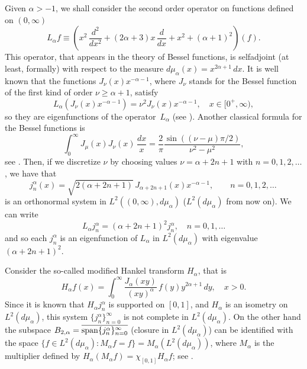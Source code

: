 \documentclass[11pt,a4paper]{amsart}
\newcommand{\htr}{H_{\alpha}} %
\newcommand{\ma}{M_{\alpha}}
\newcommand{\mua}{d\mu_\alpha}
\newcommand{\jna}{j_n^{\alpha}}
\newcommand{\spa}{\operatornamewithlimits{span}} %
\theoremstyle{plain}
\theoremstyle{remark}
\begin{document}
Given $\alpha > -1$, we shall consider the second order operator on functions defined on $(0,\infty)$
\[
  L_\alpha f \equiv \left(x^2\, \frac{d^2}{dx^2}
    + (2\alpha+3)x\, \frac{d}{dx} + x^2 + (\alpha+1)^2 \right)(f).
\]
This operator, that appears in the theory of Bessel functions,
is selfadjoint (at least, formally) with respect to the measure
$\mua(x) = x^{2\alpha+1}\,dx$. It is well known that the functions
$J_{\nu}(x) x^{-\alpha-1}$, where $J_\nu$ stands for the Bessel function
of the first kind of order $\nu \ge \alpha+1$, satisfy
\[
  L_\alpha (J_{\nu}(x) x^{-\alpha-1}) = \nu^2 J_{\nu}(x) x^{-\alpha-1},
  \quad x \in [0^+,\infty),
\]
so they are eigenfunctions of the operator~$L_\alpha$
(see \cite[\S\,5.73, p.~158]{Wat}).
Another classical formula for the Bessel functions is
\[
  \int_0^\infty J_{\mu}(x) J_{\nu}(x)\,\frac{dx}{x}
  = \frac{2}{\pi} \frac{\sin((\nu-\mu)\pi/2)}{\nu^2-\mu^2},
\]
see \cite[\S\,13.41, p.~404]{Wat}.
Then, if we discretize $\nu$ by choosing values $\nu = \alpha+2n+1$
with $n = 0,1,2,\dots$, we have that
\begin{equation*}
  \jna(x) = \sqrt{2(\alpha+2n+1)}\,J_{\alpha+2n+1}(x) x^{-\alpha-1},
  \qquad n = 0,1,2,\dots\,
\end{equation*}
is an orthonormal system in $L^2((0,\infty),\mua)$ ($L^2(\mua)$ from now on).
We can write
\[
  L_\alpha \jna = (\alpha+2n+1)^2 \jna, \quad n=0,1,\dots
\]
and so each $\jna$ is an eigenfunction of $L_\alpha$ in $L^2(\mua)$ with eigenvalue $(\alpha+2n+1)^2$.

Consider the so-called modified Hankel transform $H_\alpha$, that is 
\begin{equation}
\label{eq:htr}
  \htr f(x) = \int_0^\infty \frac{J_\alpha(xy)}{(xy)^\alpha} \, f(y)
    y^{2\alpha+1} \, dy,
  \quad x>0.
\end{equation}
Since it is known that $\htr \jna$ is supported on $[0,1]$, and $\htr$ is an isometry on $L^2(\mua)$, this system $\{\jna\}_{n=0}^\infty$ is not complete in $L^2(\mua)$.  On the other hand the subspace
$B_{2,\alpha} = \overline{\spa\{\jna\}_{n=0}^\infty}$ (closure in $L^2(\mua)$)
can be identified with the space
$\{ f \in L^2(\mua): \ma f = f \} = \ma(L^2(\mua))$,
where $\ma$ is the multiplier defined by $\htr(\ma f) = \chi_{[0,1]}\htr f$;
see \cite{V,CiStV}.
\end{document}
